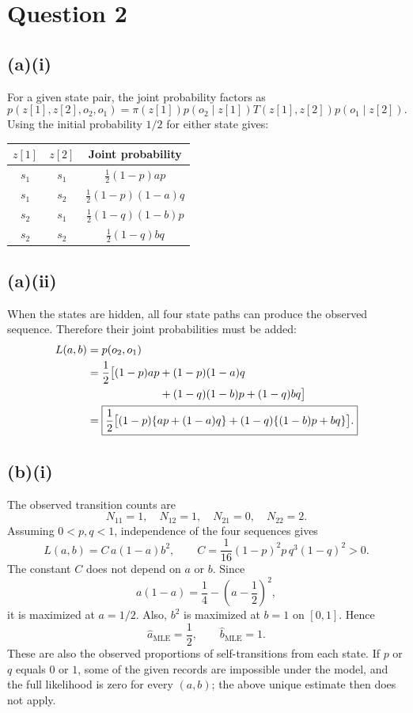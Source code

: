 \documentclass[11pt,a4paper]{article}
\begin{document}
\newpage
\section*{Question 2}
\subsection*{(a)(i)}
For a given state pair, the joint probability factors as
\[
p(z[1],z[2],o_2,o_1)
=\pi(z[1])p(o_2\mid z[1])T(z[1],z[2])p(o_1\mid z[2]).
\]
Using the initial probability $1/2$ for either state gives:
\begin{center}
\begin{tabular}{ccc}
\toprule
$z[1]$ & $z[2]$ & Joint probability\\
\midrule
$s_1$ & $s_1$ & $\frac12(1-p)ap$\\[5pt]
$s_1$ & $s_2$ & $\frac12(1-p)(1-a)q$\\[5pt]
$s_2$ & $s_1$ & $\frac12(1-q)(1-b)p$\\[5pt]
$s_2$ & $s_2$ & $\frac12(1-q)bq$\\[3pt]
\bottomrule
\end{tabular}
\end{center}

\subsection*{(a)(ii)}
When the states are hidden, all four state paths can produce the observed sequence. Therefore their joint probabilities must be added:
\begin{align*}
L(a,b)&=p(o_2,o_1)\\
&=\frac12\big[(1-p)ap+(1-p)(1-a)q\\
&\hspace{23mm}+(1-q)(1-b)p+(1-q)bq\big]\\
&=\boxed{\frac12\big[(1-p)\{ap+(1-a)q\}+(1-q)\{(1-b)p+bq\}\big].}
\end{align*}

\subsection*{(b)(i)}
The observed transition counts are
\[
N_{11}=1,\quad N_{12}=1,\quad N_{21}=0,\quad N_{22}=2.
\]
Assuming $0<p,q<1$, independence of the four sequences gives
\[
L(a,b)=C\,a(1-a)b^2,
\qquad C=\frac1{16}(1-p)^2p\,q^3(1-q)^2>0.
\]
The constant $C$ does not depend on $a$ or $b$. Since
\[
a(1-a)=\frac14-\left(a-\frac12\right)^2,
\]
it is maximized at $a=1/2$. Also, $b^2$ is maximized at $b=1$ on $[0,1]$. Hence
\[
\boxed{\hat a_{\mathrm{MLE}}=\frac12,\qquad\hat b_{\mathrm{MLE}}=1.}
\]
These are also the observed proportions of self-transitions from each state.
If $p$ or $q$ equals $0$ or $1$, some of the given records are impossible under the model, and the full likelihood is zero for every $(a,b)$; the above unique estimate then does not apply.
\end{document}
